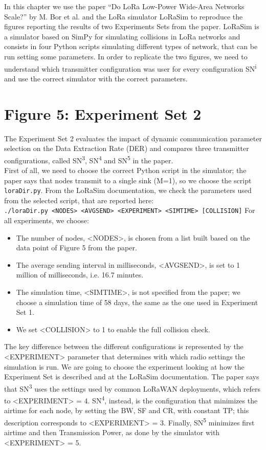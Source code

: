 In this chapter we use the paper “Do LoRa Low-Power Wide-Area Networks Scale?” by M. Bor et al. and the LoRa simulator LoRaSim to reproduce the figures reporting the results of two Experiments Sets from the paper. LoRaSim is a simulator based on SimPy for simulating collisions in LoRa networks and consists in four Python scripts simulating different types of network, that can be run setting some parameters. In order to replicate the two figures, we need to understand which transmitter configuration was user for every configuration SN\textsuperscript{i} and use the correct simulator with the correct parameters.

\section{Figure 5: Experiment Set 2}
The Experiment Set 2 evaluates the impact of dynamic communication parameter selection on the Data Extraction Rate (DER) and compares three transmitter configurations, called  SN\textsuperscript{3}, SN\textsuperscript{4} and SN\textsuperscript{5} in the paper.\\
First of all, we need to choose the correct Python script in the simulator; the paper says that nodes transmit to a single sink (M=1), so we choose the script \verb|loraDir.py|. From the LoRaSim documentation, we check the parameters used from the selected script, that are reported here:\\
\verb|./loraDir.py <NODES> <AVGSEND> <EXPERIMENT> <SIMTIME> [COLLISION]|
For all experiments, we choose:
\begin{itemize}
\item The number of nodes, <NODES>, is chosen from a list built based on the data point of Figure 5 from the paper.
\item The average sending interval in milliseconds, <AVGSEND>, is set to 1 million of milliseconds, i.e. 16.7 minutes.
\item The simulation time, <SIMTIME>, is not specified from the paper; we choose a simulation time of 58 days, the same as the one used in Experiment Set 1.
\item We set <COLLISION> to 1 to enable the full collision check.
\end{itemize}
The key difference between the different configurations is represented by the <EXPERIMENT> parameter that determines with which radio settings the simulation is run. We are going to choose the experiment looking at how the Experiment Set is described and at the LoRaSim documentation. The paper says that SN\textsuperscript{3} uses the settings used by common LoRaWAN deployments, which refers to <EXPERIMENT> = 4. SN\textsuperscript{4}, instead, is the configuration that minimizes the airtime for each node, by setting the BW, SF and CR, with constant TP; this description corresponds to <EXPERIMENT> = 3. Finally, SN\textsuperscript{5} minimizes first airtime and then Transmission Power, as done by the simulator with <EXPERIMENT> = 5.

